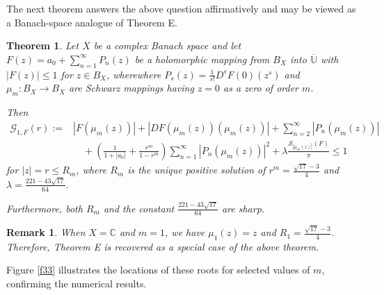 \documentclass[11pt, reqno]{amsart}
\newtheorem*{cor A}{Corollary A}
\newtheorem*{cor B}{Corollary B}
\newtheorem{theo}{Theorem}[section]
\newtheorem{rem}{Remark}[section]
\newcommand{\ol}{\overline}
\numberwithin{equation}{section}
\begin{document}
The next theorem answers the above question affirmatively and may be viewed as a Banach-space analogue of Theorem E.

\begin{theo}\label{T3}
Let $X$ be a complex Banach space and let $F(z)=a_0+\sum_{n=1}^{\infty}P_n(z)$ be a holomorphic mapping from $B_X$ into $\ol{\mathbb U}$ with $|F(z)|\leq 1$ for $z\in B_X$, wherewhere $P_{s}(z)=\frac{1}{s!}D^{s}F(0)(z^{s})$ and $\mu_m:B_{X}\to B_{X}$ are  Schwarz mappings having $z=0$ as a zero of order $m$.


Then
\[
\begin{aligned}
\mathcal G_{1,F}(r)
:=&
|F(\mu_m(z))|
+|DF(\mu_m(z))(\mu_m(z))|
+\sum_{n=2}^{\infty}|P_n(\mu_m(z))|
\\
&\quad
+\left(\frac{1}{1+|a_0|}
+\frac{r^m}{1-r^m}\right)
\sum_{n=1}^{\infty}|P_n(\mu_m(z))|^2
+\lambda\frac{\mathcal S_{|\mu_m(z)|}(F)}{\pi}
\le1
\end{aligned}
\]
for $|z|=r\le R_m$, where $R_m$ is the unique positive solution of $r^m=\frac{\sqrt{17}-3}{4}$ and $\lambda=\frac{221-43\sqrt{17}}{64}.$

Furthermore, both $R_m$ and the constant $\frac{221-43\sqrt{17}}{64}$
are sharp.
\end{theo}

\begin{rem}
When $X=\mathbb C$ and $m=1$, we have $\mu_1(z)=z$ and $R_1=\frac{\sqrt{17}-3}{4}.$
Therefore, Theorem E is recovered as a special case of the above theorem.
\end{rem}
Figure \ref{f33} illustrates the locations of these roots for selected values of $m$, confirming the numerical results.
 
\end{document}
